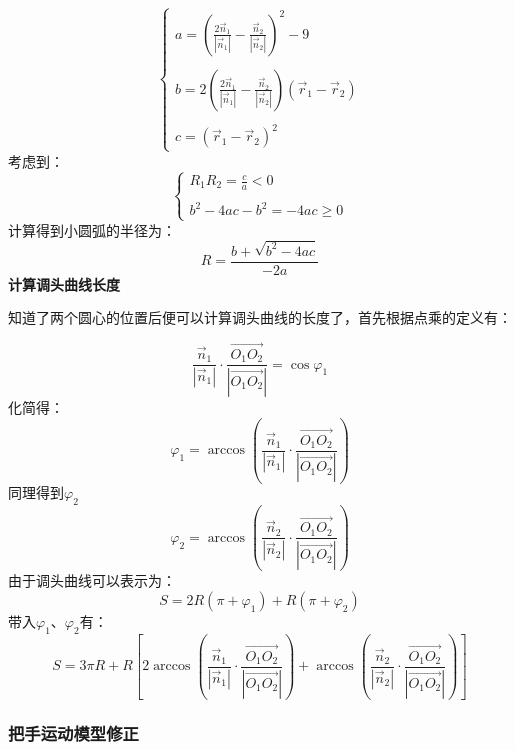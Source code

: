 \documentclass[withoutpreface,bwprint]{cumcmthesis}
\begin{document}
$$
\left\{\begin{matrix}a=\left ( \frac{2\overrightarrow{n} _{1} }{\left | \overrightarrow{n} _{1} \right | }-\frac{\overrightarrow{n} _{2} }{\left | \overrightarrow{n} _{2} \right | } \right ) ^{2} -9\\ \\b=2\left ( \frac{2\overrightarrow{n} _{1} }{\left | \overrightarrow{n} _{1} \right | }-\frac{\overrightarrow{n} _{2} }{\left | \overrightarrow{n} _{2} \right | } \right ) \left ( \overrightarrow{r} _{1}-\overrightarrow{r} _{2} \right )\\  \\c=\left ( \overrightarrow{r} _{1}-\overrightarrow{r} _{2} \right )^{2}  \end{matrix}\right.
$$
考虑到：
$$
\left\{\begin{matrix}R_{1} R_{2}=\frac{c}{a}  < 0 \\ \\b^{2} -4ac-b^{2}=-4ac\ge 0 \end{matrix}\right.
$$
计算得到小圆弧的半径为：
$$
R=\frac{b+\sqrt{b^{2} -4ac} }{-2a} 
$$
\textbf{计算调头曲线长度}

知道了两个圆心的位置后便可以计算调头曲线的长度了，首先根据点乘的定义有：

$$
\frac{\overrightarrow{n} _{1} }{\left | \overrightarrow{n} _{1} \right | }\cdot \frac{\overrightarrow{O_{1}O_{2}  } }{\left | \overrightarrow{O_{1}O_{2}  }  \right | } =\cos \varphi _{1} 
$$
化简得：
$$
\varphi _{1} =\arccos \left ( \frac{\overrightarrow{n} _{1} }{\left | \overrightarrow{n} _{1} \right | }\cdot \frac{\overrightarrow{O_{1}O_{2}  } }{\left | \overrightarrow{O_{1}O_{2}  }  \right | } \right ) 
$$
同理得到$\varphi_2$
$$
\varphi _{2} =\arccos \left ( \frac{\overrightarrow{n} _{2} }{\left | \overrightarrow{n} _{2} \right | }\cdot \frac{\overrightarrow{O_{1}O_{2}  } }{\left | \overrightarrow{O_{1}O_{2}  }  \right | } \right ) 
$$
由于调头曲线可以表示为：
$$
S=2R\left ( \pi+\varphi _{1}  \right ) +R\left ( \pi +\varphi _{2}  \right ) 
$$
带入$\varphi_1$、$\varphi_2$有：
$$
S=3 \pi R+R\left [  2\arccos \left ( \frac{\overrightarrow{n} _{1} }{\left | \overrightarrow{n} _{1} \right | }\cdot \frac{\overrightarrow{O_{1}O_{2}  } }{\left | \overrightarrow{O_{1}O_{2}  }  \right | } \right )  +\arccos \left ( \frac{\overrightarrow{n} _{2} }{\left | \overrightarrow{n} _{2} \right | }\cdot \frac{\overrightarrow{O_{1}O_{2}  } }{\left | \overrightarrow{O_{1}O_{2}  }  \right | } \right ) \right ] 
$$
\subsubsection{把手运动模型修正}
\end{document}
